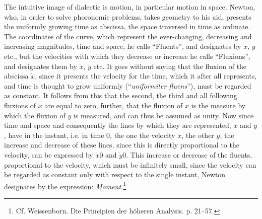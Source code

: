 \documentclass[12pt,a4paper,openany]{book}
\newcommand{\opage}[1]{\marginnote{\footnotesize\textit{[#1]}}}
\begin{document}
The intuitive image of dialectic is motion, in particular
motion in space. Newton, who, in order to solve phoronomic
problems, takes geometry to his aid, presents the
uniformly growing time as abscissa, the space traversed in time
as ordinate. The coordinates of the curve, which
represent the ever-changing, decreasing and increasing magnitudes,
time and space, he calls ``Fluents'', and
designates by $x$, $y$ etc., but the velocities with which
they decrease or increase he calls ``Fluxions'', and designates
them by $\dot{x}$, $\dot{y}$ etc. It goes without saying that the fluxion of the abscissa $\dot{x}$, since it presents the velocity for the time,
which it after all represents, and time is thought to grow uniformly
(``\textit{uniformiter fluens}''), must be regarded as constant. It
follows from this that the second, the third and all following
fluxions of $x$ are equal to zero, further, that the fluxion of $x$ is the measure by which the fluxion of $y$ is measured, and
can thus be assumed as unity. Now since time and space and
\setcounter{footnote}{0}%
\opage{82}consequently the lines by which they are represented, $x$ and $y$, have in the instant, i.e. in time $0$, the one the velocity $\dot{x}$, the other $\dot{y}$, the increase and decrease of these lines, since this
is directly proportional to the velocity, can be expressed
by $\dot{x}0$ and $\dot{y}0$. This increase or decrease of the fluents, proportional to the velocity, which must be infinitely small, since
the velocity can be regarded as constant only with respect to the single instant,
Newton designates by the expression:
\emph{Moment.}\footnote[1]{Cf. Weissenborn. Die Principien der höheren Analysis. p. 21--57.}
\end{document}
